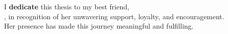 \newpage
\thispagestyle{empty}
\vspace*{7.9cm}

{
    
    \large
    \vspace{0.5cm}
    
    
   
    
    \parbox{0.8\textwidth}{
        \centering
        I \textbf{dedicate} this thesis to my best friend,\\ \textbf\large{{}},
        in recognition of her unwavering support, loyalty, and encouragement.\\
        Her presence has made this journey meaningful and fulfilling.
    }
}
\cleardoublepage
